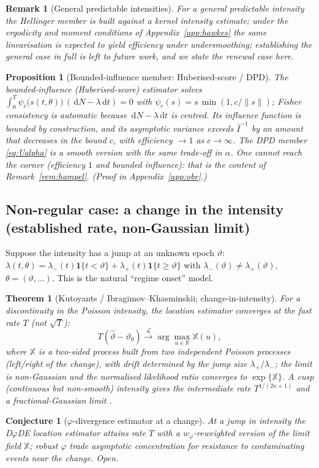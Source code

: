 \documentclass[11pt]{article}
\newtheorem{theorem}{Theorem}
\newtheorem{proposition}{Proposition}
\newtheorem{conjecture}{Conjecture}
\newtheorem{remark}{Remark}
\newcommand{\dd}{\,\mathrm{d}}
\newcommand{\R}{\mathbb{R}}
\newcommand{\toL}{\xrightarrow{\mathcal{L}}}
\begin{document}
\begin{remark}[General predictable intensities]\label{rem:hellgen}
For a general predictable intensity the Hellinger member is built against a kernel
\emph{intensity} estimate; under the ergodicity and moment conditions of
Appendix~\ref{app:hawkes} the same linearisation is expected to yield efficiency under
undersmoothing; establishing the general case in full is left to future work, and we
state the renewal case here.
\end{remark}
\begin{proposition}[Bounded-influence member: Huberised-score / DPD]
\label{prop:obr}
The bounded-influence (Huberised-score) estimator solves
$\int_0^T \psi_c\big(s(t,\theta)\big)\,(\dd N-\lambda\dd t)=0$ with
$\psi_c(s)=s\,\min(1,c/\|s\|)$; Fisher consistency is automatic because
$\dd N-\lambda\dd t$ is centred. Its influence function is bounded by construction,
and its asymptotic variance exceeds $\bar I^{-1}$ by an amount that decreases in the
bound $c$, with efficiency $\to1$ as $c\to\infty$. The DPD member \eqref{eq:Ualpha}
is a smooth version with the same trade-off in $\alpha$. One cannot reach the
corner (efficiency $1$ and bounded influence): that is the content of
Remark~\ref{rem:hampel}. (Proof in Appendix~\ref{app:obr}.)
\end{proposition}

\subsection{Non-regular case: a change in the intensity (established rate, non-Gaussian limit)}
Suppose the intensity has a jump at an unknown epoch $\vartheta$:
$\lambda(t,\theta)=\lambda_-(t)\mathbf{1}\{t<\vartheta\}+\lambda_+(t)\mathbf 1\{t\ge\vartheta\}$
with $\lambda_-(\vartheta)\neq\lambda_+(\vartheta)$, $\theta=(\vartheta,\dots)$.
This is the natural ``regime onset'' model.
\begin{theorem}[Kutoyants / Ibragimov--Khasminskii; change-in-intensity]\label{thm:change}
For a discontinuity in the Poisson intensity, the location estimator converges at
the \emph{fast} rate $T$ (not $\sqrt T$):
\[
T(\hat\vartheta-\vartheta_0)\toL \arg\max_{u\in\R} \mathbb{X}(u),
\]
where $\mathbb X$ is a two-sided process built from two independent Poisson
processes (left/right of the change), with drift determined by the jump size
$\lambda_+/\lambda_-$; the limit is non-Gaussian and the normalised likelihood
ratio converges to $\exp\{\mathbb X\}$. \citep{kutoyants1998,ih1981,dachian2003}
A \emph{cusp} (continuous but non-smooth) intensity gives the intermediate rate
$T^{1/(2\kappa+1)}$ and a fractional-Gaussian limit \citep{dachian2003}.
\end{theorem}
\begin{conjecture}[$\varphi$-divergence estimator at a change]\label{conj:change}
At a jump in intensity the D$\varphi$DE location estimator attains rate $T$ with a
$w_\varphi$-reweighted version of the limit field $\mathbb X$; robust $\varphi$
trade asymptotic concentration for resistance to contaminating events near the
change. Open.
\end{conjecture}
\end{document}
